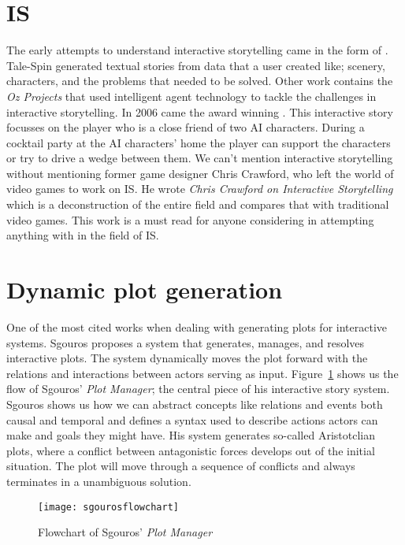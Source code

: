 \section{IS}
The early attempts to understand interactive storytelling came in the form of \cite{Meehan77talespin}. Tale-Spin generated textual stories from data that a user created like; scenery, characters, and the problems that needed to be solved. Other work contains the \textit{Oz Projects}\cite{Mateas97anozcentric} that used intelligent agent technology to tackle the challenges in interactive storytelling. In 2006 came the award winning \citep{Mateas03facade:an}. This interactive story focusses on the player who is a close friend of two AI characters. During a cocktail party at the AI characters' home the player can support the characters or try to drive a wedge between them. We can't mention interactive storytelling without mentioning former game designer Chris Crawford, who left the world of video games to work on IS. He wrote \textit{Chris Crawford on Interactive Storytelling}\cite{crawford2012chris} which is a deconstruction of the entire field and compares that with traditional video games. This work is a must read for anyone considering in attempting anything with in the field of IS.


\section{Dynamic plot generation}
One of the most cited works when dealing with generating plots for interactive systems. Sgouros proposes a system that generates, manages, and resolves interactive plots\cite{Sgouros199929}. The system dynamically moves the plot forward with the relations and interactions between actors serving as input. Figure~\ref{fig:sgouros_flowchart} shows us the flow of Sgouros' \textit{Plot Manager}; the central piece of his interactive story system. Sgouros shows us how we can abstract concepts like relations and events both causal and temporal and defines a syntax used to describe actions actors can make and goals they might have. His system generates so-called Aristotclian plots, where a conflict between antagonistic forces develops out of the initial situation. The plot will move through a sequence of conflicts and always terminates in a unambiguous solution. 

\begin{figure}
	\texttt{[image: sgourosflowchart]}
	\caption{Flowchart of Sgouros' \textit{Plot Manager}}
	\label{fig:sgouros_flowchart}
\end{figure}

